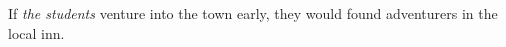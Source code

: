 \documentclass[letterpaper,twocolumn,openany,nodeprecatedcode]{dndbook}
\begin{document}

If \emph{the students} venture into the town early, they would found adventurers in the local inn.
\end{document}
